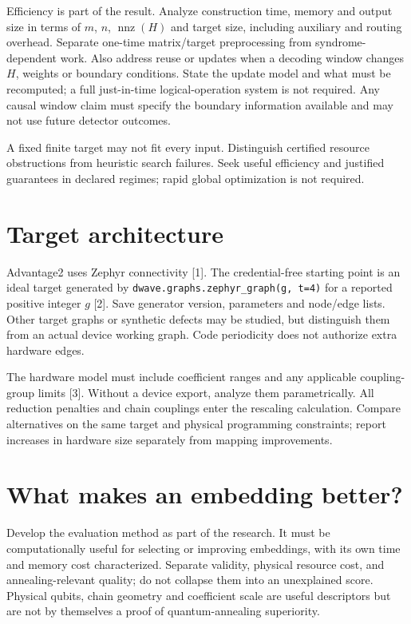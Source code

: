 \documentclass[11pt,letterpaper]{article}
\begin{document}
Efficiency is part of the result. Analyze construction time, memory and output size in terms of $m$, $n$, $\operatorname{nnz}(H)$ and target size, including auxiliary and routing overhead. Separate one-time matrix/target preprocessing from syndrome-dependent work. Also address reuse or updates when a decoding window changes $H$, weights or boundary conditions. State the update model and what must be recomputed; a full just-in-time logical-operation system is not required. Any causal window claim must specify the boundary information available and may not use future detector outcomes.\par

A fixed finite target may not fit every input. Distinguish certified resource obstructions from heuristic search failures. Seek useful efficiency and justified guarantees in declared regimes; rapid global optimization is not required.\par

\section{Target architecture}

Advantage2 uses Zephyr connectivity [1]. The credential-free starting point is an ideal target generated by \texttt{dwave.graphs.zephyr\_graph(g, t=4)} for a reported positive integer $g$ [2]. Save generator version, parameters and node/edge lists. Other target graphs or synthetic defects may be studied, but distinguish them from an actual device working graph. Code periodicity does not authorize extra hardware edges.\par

The hardware model must include coefficient ranges and any applicable coupling-group limits [3]. Without a device export, analyze them parametrically. All reduction penalties and chain couplings enter the rescaling calculation. Compare alternatives on the same target and physical programming constraints; report increases in hardware size separately from mapping improvements.\par

\section{What makes an embedding better?}

Develop the evaluation method as part of the research. It must be computationally useful for selecting or improving embeddings, with its own time and memory cost characterized. Separate validity, physical resource cost, and annealing-relevant quality; do not collapse them into an unexplained score. Physical qubits, chain geometry and coefficient scale are useful descriptors but are not by themselves a proof of quantum-annealing superiority.\par
\end{document}
